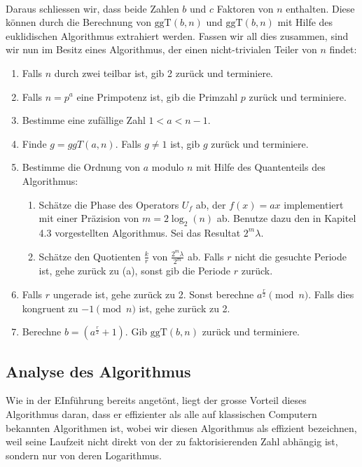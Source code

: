 \paragraph{}
Daraus schliessen wir, dass beide Zahlen $b$ und $c$ Faktoren von $n$ enthalten. Diese können durch die Berechnung von $\text{ggT}(b, n)$ und $\text{ggT}(b, n)$ mit Hilfe des euklidischen Algorithmus extrahiert werden. Fassen wir all dies zusammen, sind wir nun im Besitz eines Algorithmus, der einen nicht-trivialen Teiler von $n$ findet:
\begin{enumerate}
    \item Falls $n$ durch zwei teilbar ist, gib 2 zurück und terminiere.
    \item Falls $n = p^a$ eine Primpotenz ist, gib die Primzahl $p$ zurück und terminiere.
    \item Bestimme eine zufällige Zahl $1 < a < n - 1$.
    \item Finde $g = ggT(a, n)$. Falls $g \neq 1$ ist, gib $g$ zurück und terminiere.
    \item Bestimme die Ordnung von $a$ modulo $n$ mit Hilfe des Quantenteils des Algorithmus:
    \begin{enumerate}
        \item Schätze die Phase des Operators $U_f$ ab, der $f(x) = ax$ implementiert mit einer Präzision von $m = 2\log_2(n)$ ab. Benutze dazu den in Kapitel 4.3 vorgestellten Algorithmus. Sei das Resultat $2^m\lambda$.
        \item Schätze den Quotienten $\frac{k}{r}$ von $\frac{2^m\lambda}{2^m}$ ab. Falls $r$ nicht die gesuchte Periode ist, gehe zurück zu (a), sonst gib die Periode $r$ zurück.
    \end{enumerate}
    \item Falls $r$ ungerade ist, gehe zurück zu 2. Sonst berechne $a^{\frac{r}{2}} \pmod{n}$. Falls dies kongruent zu $-1 \pmod{n}$ ist, gehe zurück zu 2.
    \item Berechne $b = (a^\frac{r}{2} + 1)$. Gib $\text{ggT}(b, n)$ zurück und terminiere.
\end{enumerate}
\subsection{Analyse des Algorithmus}
Wie in der EInführung bereits angetönt, liegt der grosse Vorteil dieses Algorithmus daran, dass er effizienter als alle auf klassischen Computern bekannten Algorithmen ist, wobei wir diesen Algorithmus als effizient bezeichnen, weil seine Laufzeit nicht direkt von der zu faktorisierenden Zahl abhängig ist, sondern nur von deren Logarithmus.
